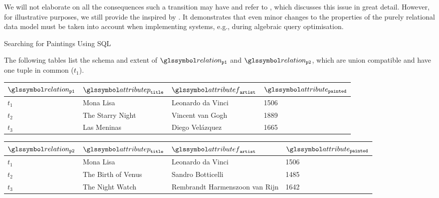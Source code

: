 We will not elaborate on all the consequences such a transition may have and refer to \cite{Garcia:2009Database}, which discusses this issue in great detail. However, for illustrative  purposes, we still provide the  inspired by \cite{Garcia:2009Database}. It demonstrates that even minor changes to the properties of the purely relational data model must be taken into account when implementing systems, e.g., during algebraic query optimisation.

\begin{example}[label=example:bag_vs_set]{Searching for Paintings Using SQL}{}

    The following tables list the schema and extent of $\relation_{\mathtt{p1}}$ and $\relation_{\mathtt{p2}}$, which are union compatible and have one tuple in common ($t_1$).

    \begin{center}
        \begin{tabular}{ l || l | l | l |}
            $\relation_{\mathtt{p1}}$ & $\attributep_{\mathtt{title}}$  & $\attributef_{\mathtt{artist}}$  & $\attribute_{\mathtt{painted}}$ \\ 
            \hline
            \hline
            $t_1$ & Mona Lisa &  Leonardo da Vinci & 1506 \\
            \hline
            $t_2$ & The Starry Night & Vincent van Gogh & 1889 \\
            \hline
            $t_3$ & Las Meninas & Diego Velázquez & 1665 \\
            \hline
        \end{tabular}
    \end{center}

    \begin{center}
        \begin{tabular}{ l || l | l | l |}
            $\relation_{\mathtt{p2}}$ & $\attributep_{\mathtt{title}}$  & $\attributef_{\mathtt{artist}}$  & $\attribute_{\mathtt{painted}}$ \\ 
            \hline
            \hline
            $t_1$ & Mona Lisa &  Leonardo da Vinci & 1506 \\
            \hline
            $t_2$ & The Birth of Venus & Sandro Botticelli & 1485 \\
            \hline
            $t_3$ & The Night Watch & Rembrandt Harmenszoon van Rijn & 1642 \\
            \hline
        \end{tabular}
    \end{center}
    

\end{example}
